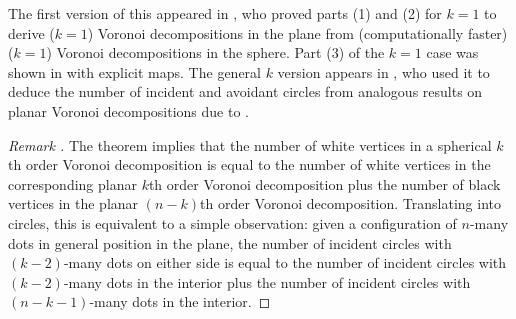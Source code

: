 \documentclass[11pt,oneside]{amsart}
\theoremstyle{definition}
\theoremstyle{remark}
\newenvironment{rem}{\refstepcounter{thm}\begin{proof}[Remark \emph{\thethm}]\renewcommand*{\qedsymbol}{\(\blacksquare\)}}{\end{proof}}
\newenvironment{warn}{\refstepcounter{thm}\begin{proof}[Warning \emph{\thethm}]\renewcommand*{\qedsymbol}{\(\blacksquare\)}}{\end{proof}}
\numberwithin{equation}{section}
\begin{document}
The first version of this appeared in \cite{Brown79}, who proved parts (1) and (2) for $k=1$ to derive ($k=1$) Voronoi decompositions in the plane from (computationally faster) ($k=1$) Voronoi decompositions in the sphere. Part (3) of the $k=1$ case was shown in \cite{NLC02} with explicit maps. The general $k$ version appears in \cite{CHP22}, who used it to deduce the number of incident and avoidant circles from analogous results on planar Voronoi decompositions due to \cite{Lin03}.

\begin{rem}
The theorem implies that the number of white vertices in a spherical $k$th order Voronoi decomposition is equal to the number of white vertices in the corresponding planar $k$th order Voronoi decomposition plus the number of black vertices in the planar $(n-k)$th order Voronoi decomposition. Translating into circles, this is equivalent to a simple observation: given a configuration of $n$-many dots in general position in the plane, the number of incident circles with $(k-2)$-many dots on either side is equal to the number of incident circles with $(k-2)$-many dots in the interior plus the number of incident circles with $(n-k-1)$-many dots in the interior.
\end{rem}






\end{document}
